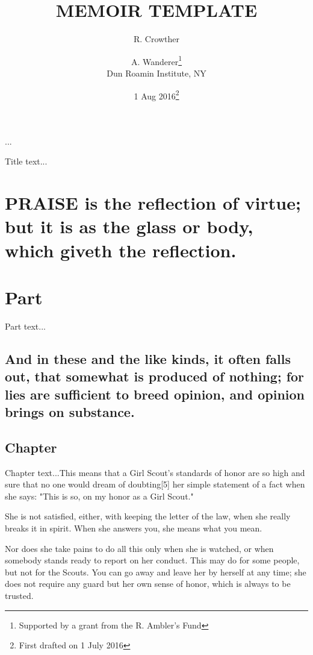 \documentclass[a4paper, 12pt]{memoir}
\begin{document}
\title{MEMOIR TEMPLATE}
\author{R. Crowther \and
A. Wanderer\thanks{Supported by a grant from the
R. Ambler’s Fund}\\
Dun Roamin Institute, NY}
\date{1 Aug 2016\thanks{First drafted on 1 July 2016}}
...
\maketitle

\frontmatter
\mainmatter



Title text...

\part{ PRAISE is the reflection of virtue; but it is as the glass or body, which giveth the reflection. }
\part{ Part } 
Part text...

\chapter*{ And in these and the like kinds, it often falls out, that somewhat is produced of nothing; for lies are sufficient to breed opinion, and opinion brings on substance. } 
\chapter*{ Chapter } 
\selectfont
\selectfont
\selectfont

Chapter text...This means that a Girl Scout's standards of honor are so high and sure that no one would dream of doubting[5] her simple statement of a fact when she says: "This is so, on my honor as a Girl Scout."

She is not satisfied, either, with keeping the letter of the law, when she really breaks it in spirit. When she answers you, she means what you mean.

Nor does she take pains to do all this only when she is watched, or when somebody stands ready to report on her conduct. This may do for some people, but not for the Scouts. You can go away and leave her by herself at any time; she does not require any guard but her own sense of honor, which is always to be trusted.
\end{document}
